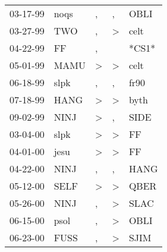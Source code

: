 \begin{supertabular}{p{0.07\textwidth}p{0.06\textwidth}p{0.02\textwidth}p{0.02\textwidth}p{0.06\textwidth}}
          03-17-99\textsuperscript{} &           noqs\textsuperscript{} &                , &                , &           OBLI\textsuperscript{} \\
          03-27-99\textsuperscript{} &            TWO\textsuperscript{} &                , &     \textgreater &           celt\textsuperscript{} \\
          04-22-99\textsuperscript{} &             FF\textsuperscript{} &                , &                  &                            *CS1* \\
          05-01-99\textsuperscript{} &           MAMU\textsuperscript{} &     \textgreater &     \textgreater &           celt\textsuperscript{} \\
          06-18-99\textsuperscript{} &           slpk\textsuperscript{} &                , &                , &           fr90\textsuperscript{} \\
          07-18-99\textsuperscript{} &           HANG\textsuperscript{} &     \textgreater &     \textgreater &           byth\textsuperscript{} \\
          09-02-99\textsuperscript{} &           NINJ\textsuperscript{} &     \textgreater &                , &           SIDE\textsuperscript{} \\
          03-04-00\textsuperscript{} &           slpk\textsuperscript{} &     \textgreater &     \textgreater &             FF\textsuperscript{} \\
          04-01-00\textsuperscript{} &           jesu\textsuperscript{} &     \textgreater &     \textgreater &             FF\textsuperscript{} \\
          04-22-00\textsuperscript{} &           NINJ\textsuperscript{} &                , &                , &           HANG\textsuperscript{} \\
          05-12-00\textsuperscript{} &           SELF\textsuperscript{} &     \textgreater &     \textgreater &           QBER\textsuperscript{} \\
          05-26-00\textsuperscript{} &           NINJ\textsuperscript{} &                , &     \textgreater &           SLAC\textsuperscript{} \\
          06-15-00\textsuperscript{} &           psol\textsuperscript{} &                , &     \textgreater &           OBLI\textsuperscript{} \\
          06-23-00\textsuperscript{} &           FUSS\textsuperscript{} &                , &     \textgreater &           SJIM\textsuperscript{} \\

\end{supertabular}
